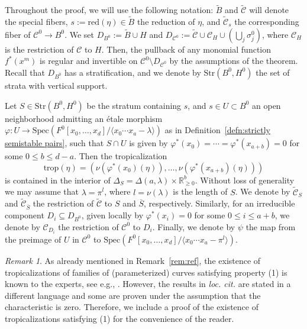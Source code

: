 \documentclass[11pt,reqno]{amsart}
\numberwithin{equation}{section}
\theoremstyle{definition}
\newcommand{\trop}{\mathrm{trop}}
\newcommand{\Spec}{{\rm Spec}}
\def\:{\colon}
\newcommand{\cC}{{\mathcal{C}}}
\newcommand{\red}{\mathrm{red}}
\theoremstyle{remark}
\newtheorem{rem}[thm]{Remark}
\begin{document}
Throughout the proof, we will use the following notation: $\widetilde B$ and $\widetilde \cC$ will denote the special fibers, %
$s:=\red(\eta)\in \widetilde B$ the reduction of $\eta$, and $\widetilde\cC_s$ the corresponding fiber of $\cC^0\to B^0$. We set $D_{B^0}:=\widetilde B \cup H$ and $D_{\cC^0}:=\widetilde \cC \cup  \cC_H \cup \left( \bigcup_j \sigma_j^0 \right)$, where $\cC_H$ is the restriction of $\cC$ to $H$. Then, the pullback of any monomial function $f^*(x^m)$ is regular and invertible on $\cC^0 \setminus D_{\cC^0}$ by the assumptions of the theorem. Recall that $D_{B^0}$ has a stratification, and we denote by $\mathrm{Str}(B^0,H^0)$ the set of strata with vertical support. 

Let $S\in \mathrm{Str}(B^0,H^0)$ be the stratum containing $s$, and $s\in U\subset B^0$ an open neighborhood admitting an \'etale morphism
$\varphi\colon U\rightarrow \mathrm{Spec}\left(F^0[x_0,\dotsc,x_d]/\langle x_0\cdots x_a-\lambda\rangle\right)$ as in Definition~\ref{defn:strictly semistable pairs}, such that $S\cap U$ is given by
$\varphi^*(x_0)=\cdots=\varphi^*(x_{a+b})=0$ for some $0\le b\leq d-a$. Then the tropicalization $$\trop(\eta)=\left(\nu\left(\varphi^*(x_0)(\eta)\right),\dotsc,\nu\left(\varphi^*(x_{a+b})(\eta)\right)\right)$$
is contained in the interior of $\Delta_{S}=\Delta(a,\lambda)\times \mathbb R^b_{\geq 0}$. Without loss of generality we may assume that $\lambda=\pi^l$, where $l=\nu(\lambda)$ is the length of $S$.
We denote by $\widetilde\cC_S$ and $\widetilde\cC_{\overline S}$ the restriction of $\widetilde \cC$ to $S$ and $\overline S$, respectively. Similarly, for an irreducible component $D_i\subseteq D_{B^0}$, given locally by $\varphi^*(x_i)=0$ for some $0\leq i\leq a+b$, we denote by $\cC_{D_i}$ the restriction of $\cC^0$ to  $D_i$. Finally, we denote by $\psi$ the map from the preimage of $U$ in $\cC^0$ to $\mathrm{Spec}\left(F^0[x_0,\dotsc,x_d]/\langle x_0\cdots x_a-\pi^l\rangle\right)$.


\begin{rem}
    As already mentioned in Remark~\ref{rem:ref}, the existence of tropicalizations of families of (parameterized) curves satisfying property (1) is known to the experts, see e.g., \cite{ACGS,CCUW,R17,Ran22}. However, the results in {\em loc. cit.} are stated in a different language and some are proven under the assumption that the characteristic is zero. Therefore, we include a proof of the existence of tropicalizations satisfying (1) for the convenience of the reader.
\end{rem}
\end{document}
